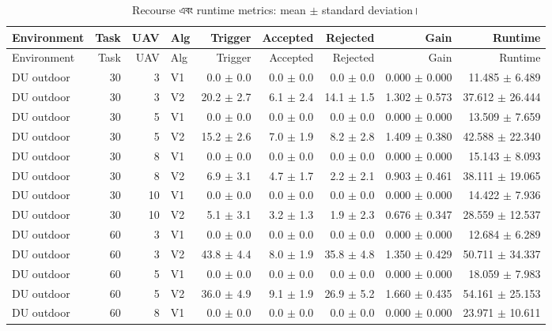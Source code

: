 \documentclass[10pt,a4paper]{article}
\begin{document}
\begin{landscape}\begin{longtable}{@{}lrrlrrrrr@{}}
\caption{Recourse এবং runtime metrics: mean $\pm$ standard deviation।}\label{tab:v2-recourse-metrics}\\
\toprule Environment & Task & UAV & Alg & Trigger & Accepted & Rejected & Gain & Runtime\\\midrule
\endfirsthead\toprule Environment & Task & UAV & Alg & Trigger & Accepted & Rejected & Gain & Runtime\\\midrule\endhead
DU outdoor & 30 & 3 & V1 & 0.0 $\pm$ 0.0 & 0.0 $\pm$ 0.0 & 0.0 $\pm$ 0.0 & 0.000 $\pm$ 0.000 & 11.485 $\pm$ 6.489 \\
DU outdoor & 30 & 3 & V2 & 20.2 $\pm$ 2.7 & 6.1 $\pm$ 2.4 & 14.1 $\pm$ 1.5 & 1.302 $\pm$ 0.573 & 37.612 $\pm$ 26.444 \\
DU outdoor & 30 & 5 & V1 & 0.0 $\pm$ 0.0 & 0.0 $\pm$ 0.0 & 0.0 $\pm$ 0.0 & 0.000 $\pm$ 0.000 & 13.509 $\pm$ 7.659 \\
DU outdoor & 30 & 5 & V2 & 15.2 $\pm$ 2.6 & 7.0 $\pm$ 1.9 & 8.2 $\pm$ 2.8 & 1.409 $\pm$ 0.380 & 42.588 $\pm$ 22.340 \\
DU outdoor & 30 & 8 & V1 & 0.0 $\pm$ 0.0 & 0.0 $\pm$ 0.0 & 0.0 $\pm$ 0.0 & 0.000 $\pm$ 0.000 & 15.143 $\pm$ 8.093 \\
DU outdoor & 30 & 8 & V2 & 6.9 $\pm$ 3.1 & 4.7 $\pm$ 1.7 & 2.2 $\pm$ 2.1 & 0.903 $\pm$ 0.461 & 38.111 $\pm$ 19.065 \\
DU outdoor & 30 & 10 & V1 & 0.0 $\pm$ 0.0 & 0.0 $\pm$ 0.0 & 0.0 $\pm$ 0.0 & 0.000 $\pm$ 0.000 & 14.422 $\pm$ 7.936 \\
DU outdoor & 30 & 10 & V2 & 5.1 $\pm$ 3.1 & 3.2 $\pm$ 1.3 & 1.9 $\pm$ 2.3 & 0.676 $\pm$ 0.347 & 28.559 $\pm$ 12.537 \\
DU outdoor & 60 & 3 & V1 & 0.0 $\pm$ 0.0 & 0.0 $\pm$ 0.0 & 0.0 $\pm$ 0.0 & 0.000 $\pm$ 0.000 & 12.684 $\pm$ 6.289 \\
DU outdoor & 60 & 3 & V2 & 43.8 $\pm$ 4.4 & 8.0 $\pm$ 1.9 & 35.8 $\pm$ 4.8 & 1.350 $\pm$ 0.429 & 50.711 $\pm$ 34.337 \\
DU outdoor & 60 & 5 & V1 & 0.0 $\pm$ 0.0 & 0.0 $\pm$ 0.0 & 0.0 $\pm$ 0.0 & 0.000 $\pm$ 0.000 & 18.059 $\pm$ 7.983 \\
DU outdoor & 60 & 5 & V2 & 36.0 $\pm$ 4.9 & 9.1 $\pm$ 1.9 & 26.9 $\pm$ 5.2 & 1.660 $\pm$ 0.435 & 54.161 $\pm$ 25.153 \\
DU outdoor & 60 & 8 & V1 & 0.0 $\pm$ 0.0 & 0.0 $\pm$ 0.0 & 0.0 $\pm$ 0.0 & 0.000 $\pm$ 0.000 & 23.971 $\pm$ 10.611 \\

\end{longtable}
\end{landscape}
\end{document}
